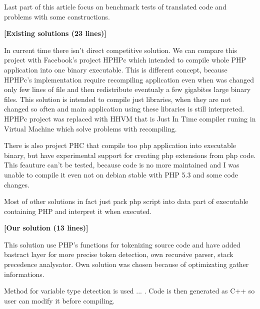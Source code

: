 \documentclass{ExcelAtFIT}
\begin{document}
		Last part of this article focus on benchmark tests of translated code and problems with some constructions.



	\textbf{[Existing solutions (23 lines)]}

		In current time there isn't direct competitive solution. We can compare this project with Facebook's project HPHPc which intended to compile whole PHP application into one binary executable. This is different concept, because HPHPc's implementation require recompiling application even when was changed only few lines of file and then redistribute eventualy a few gigabites large binary files. This solution is intended to compile just libraries, when they are not changed so often and main application using these libraries is still interpreted. HPHPc project was replaced with HHVM that is Just In Time compiler runing in Virtual Machine which solve problems with recompiling.

		There is also project PHC that compile too php application into executable binary, but have experimental support for creating php extensions from php code. This feauture can't be tested, because code is no more maintained and I was unable to compile it even not on debian stable with PHP 5.3 and some code changes.

		Most of other solutions in fact just pack php script into data part of executable containing PHP and interpret it when executed.

	\textbf{[Our solution (13 lines)]}

		This solution use PHP's functions for tokenizing source code and have added bastract layer for more precise token detection, own recursive parser, stack precedence analysator. Own solution was chosen because of optimizating gather informations.

		Method for variable type detection is used ... . Code is then generated as C++ so user can modify it before compiling.
\end{document}
